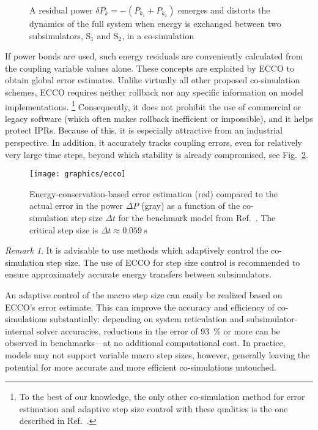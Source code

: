 \documentclass[prb,aps,showpacs,floatfix,twocolumn,10pt]{revtex4-1}
\newcommand{\sub}{subsimulator}
\newlength{\graphicswidth}
\theoremstyle{plain}
\theoremstyle{remark}
\newtheorem{remark}{Remark}[guideline]
\begin{document}
\begin{figure}[h!tb]
	\centering
	\def\svgwidth{\graphicswidth}
	
	\caption{%
		A residual power $\delta P_k = - (P_{k_1}+P_{k_2})$ emerges and distorts the dynamics of the full system when energy is exchanged between two \sub{}s, S$_1$ and S$_2$, in a co\hyp{}simulation
	}
	\label{fig:power_bond_residual}
\end{figure}

If power bonds are used, such energy residuals are conveniently calculated from the coupling variable values alone.
These concepts are exploited by ECCO to obtain global error estimates.
Unlike virtually all other proposed co-simulation schemes, ECCO requires neither rollback nor any specific information on model implementations.
\footnote{%
	\label{footnote:Busch}
	To the best of our knowledge, the only other co-simulation method for error estimation and adaptive step size control with these qualities is the one described in Ref.~\cite{Busch2012}.
}
Consequently, it does not prohibit the use of commercial or legacy software (which often makes rollback inefficient or impossible), and it helps protect IPRs.
Because of this, it is especially attractive from an industrial perspective.
In addition, it accurately tracks coupling errors, even for relatively very large time steps, beyond which stability is already compromised, see Fig.~\ref{fig:ecco}.

\begin{figure}[h!tb]
	\texttt{[image: graphics/ecco]}
	\caption{%
		Energy-conservation-based error estimation (red) compared to the actual error in the power $\Delta P$ (gray) as a function of the co-simulation step size $\Delta t$ for the benchmark model from Ref.~.
		The critical step size is $\Delta t \approx \SI{0.059}{\second}$
	}
	\label{fig:ecco}
\end{figure}

\begin{remark}
	It is advisable to use methods which adaptively control the co-simulation step size.
	The use of ECCO for step size control is recommended to ensure approximately accurate energy transfers between \sub{}s.
\end{remark}

An adaptive control of the macro step size can easily be realized based on ECCO's error estimate.
This can improve the accuracy and efficiency of co-simulations substantially:
depending on system reticulation and \sub{}-internal solver accuracies, reductions in the error of \SI{93}{\percent} or more can be observed in benchmarks---at no additional computational cost.\cite{Sadjina2016,Sadjina2016b}
In practice, models may not support variable macro step sizes, however, generally leaving the potential for more accurate and more efficient co-simulations untouched.
\end{document}
